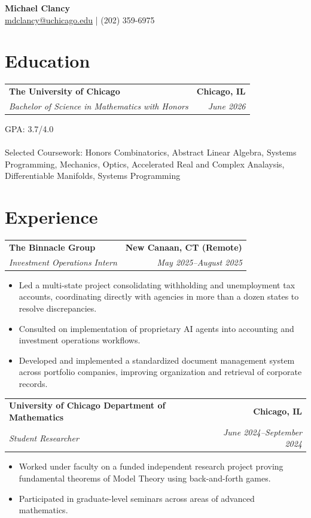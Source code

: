 \documentclass[10pt,letterpaper]{article}
\makeatletter
\newcommand{\resumeEntry}[4]{%
  \begin{tabularx}{\textwidth}{@{}X r@{}}
    \textbf{#1} & \textbf{#2} \\
    \textit{#3} & \textit{#4}
  \end{tabularx}
  \vspace{-0.25em}
}
\makeatother
\begin{document}
\begin{center}
    {\Large\bfseries Michael Clancy}\\[2pt]
    \href{mailto:mdclancy@uchicago.edu}{mdclancy@uchicago.edu}
    \quad|\quad
    (202) 359-6975
\end{center}

\vspace{-0.4em}

\section{Education}

\resumeEntry
  {The University of Chicago}{Chicago, IL}
  {Bachelor of Science in Mathematics with Honors}{June 2026}
GPA: 3.7/4.0\\
\\
Selected Coursework: Honors Combinatorics, Abstract Linear Algebra, Systems Programming, Mechanics, Optics, Accelerated Real and Complex Analaysis, Differentiable Manifolds, Systems Programming

\section{Experience}

\resumeEntry
  {The Binnacle Group}{New Canaan, CT (Remote)}
  {Investment Operations Intern}{May 2025--August 2025}
\begin{itemize}
  \item Led a multi-state project consolidating withholding and unemployment tax accounts, coordinating directly with agencies in more than a dozen states to resolve discrepancies.
  \item Consulted on implementation of proprietary AI agents into accounting and investment operations workflows.
  \item Developed and implemented a standardized document management system across portfolio companies, improving organization and retrieval of corporate records.
\end{itemize}

\resumeEntry
  {University of Chicago Department of Mathematics}{Chicago, IL}
  {Student Researcher}{June 2024--September 2024}
\begin{itemize}
  \item Worked under faculty on a funded independent research project proving fundamental theorems of Model Theory using back-and-forth games.
  \item Participated in graduate-level seminars across areas of advanced mathematics.
\end{itemize}
\end{document}
